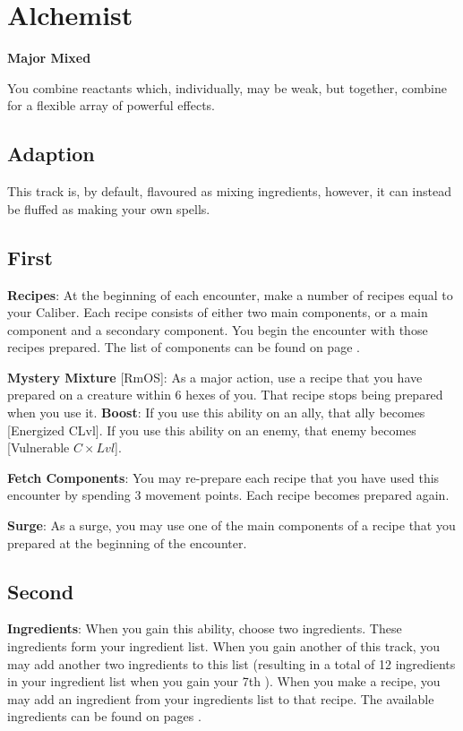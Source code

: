 \section{Alchemist}
\textbf{Major Mixed}

You combine reactants which, individually, may be weak, but together, combine for a flexible array of powerful effects.

\subsection*{Adaption}
This track is, by default, flavoured as mixing ingredients, however, it can instead be fluffed as making your own spells.

\begin{multicols*}{2}
\subsection*{First \Facet\perk}
\textbf{Recipes}: At the beginning of each encounter, make a number of recipes equal to your Caliber. Each recipe consists of either two main components, or a main component and a secondary component. You begin the encounter with those recipes prepared. The list of components can be found on page \hyperref[alchposmain]{\pageref{alchposmain}}.

\textbf{Mystery Mixture} [RmOS]: As a major action, use a recipe that you have prepared on a creature within 6 hexes of you. That recipe stops being prepared when you use it. \textbf{Boost}: If you use this ability on an ally, that ally becomes [Energized CLvl]. If you use this ability on an enemy, that enemy becomes [Vulnerable $C\times Lvl$].

\textbf{Fetch Components}: You may re-prepare each recipe that you have used this encounter by spending 3 movement points. Each recipe becomes prepared again.

\textbf{Surge}: As a surge, you may use one of the main components of a recipe that you prepared at the beginning of the encounter.

\subsection*{Second \Facet}
\textbf{Ingredients}: When you gain this ability, choose two ingredients. These ingredients form your ingredient list. When you gain another \facet of this track, you may add another two ingredients to this list (resulting in a total of 12 ingredients in your ingredient list when you gain your 7th \facet). When you make a recipe, you may add an ingredient from your ingredients list to that recipe. The available ingredients can be found on pages \hyperref[alchposing]{\pageref{alchposing}}.


\end{multicols*}
